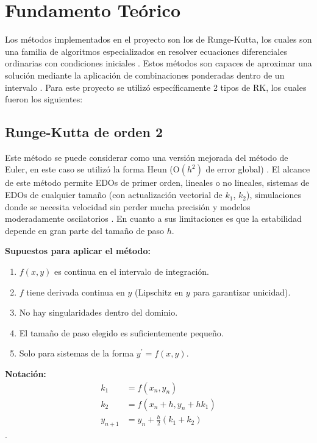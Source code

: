 	\chapter{Fundamento Teórico}
	Los métodos implementados en el proyecto son los de Runge-Kutta, los cuales son una familia de algoritmos especializados en resolver ecuaciones diferenciales ordinarias con condiciones iniciales \parencite{zill2018}. Estos métodos son capaces de aproximar una solución mediante la aplicación de combinaciones ponderadas dentro de un intervalo \parencite{zill2018}. Para este proyecto se utilizó específicamente 2 tipos de RK, los cuales fueron los siguientes:
	
	\section{Runge-Kutta de orden 2}
	Este método se puede considerar como una versión mejorada del método de Euler, en este caso se utilizó la forma Heun (O$(h^{2})$ de error global) \parencite{zill2018}. El alcance de este método permite EDOs de primer orden, lineales o no lineales, sistemas de EDOs de cualquier tamaño (con actualización vectorial de $k_{1}$, $k_{2}$), simulaciones donde se necesita velocidad sin perder mucha precisión y modelos moderadamente oscilatorios \parencite{zill2018}. En cuanto a sus limitaciones es que la estabilidad depende en gran parte del tamaño de paso $h$.
	
	\textbf{Supuestos para aplicar el método:}
	\begin{enumerate}
		\item $f(x,y)$ es continua en el intervalo de integración.
		\item $f$ tiene derivada continua en $y$ (Lipschitz en $y$ para garantizar unicidad).
		\item No hay singularidades dentro del dominio.
		\item El tamaño de paso elegido es suficientemente pequeño.
		\item Solo para sistemas de la forma $y^{\prime}=f(x,y)$.
	\end{enumerate}
	
	\textbf{Notación:}
	\begin{align}
		k_{1} &= f(x_{n},y_{n}) \\
		k_{2} &= f(x_{n}+h,y_{n}+hk_{1}) \\
		y_{n+1} &= y_{n}+\frac{h}{2}(k_{1}+k_{2})
	\end{align}
	\textcite{zill2018}.
	

